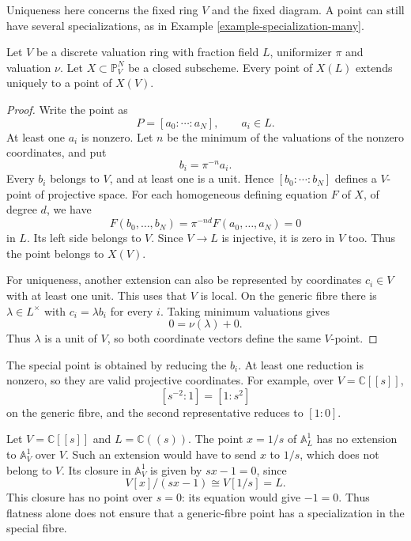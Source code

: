 Uniqueness here concerns the fixed ring
$V$ and the fixed diagram.
A point can still have several
specializations, as in Example
\ref{example-specialization-many}.

\begin{lemma}
\label{lemma-projective-dvr-extension}
Let $V$ be a discrete valuation ring
with fraction field $L$, uniformizer
$\pi$ and valuation $\nu$.
Let $X\subset\mathbb{P}^N_V$ be a closed
subscheme.
Every point of $X(L)$ extends uniquely
to a point of $X(V)$.
\end{lemma}

\begin{proof}
Write the point as
$$
P=[a_0:\cdots:a_N],\qquad a_i\in L.
$$
At least one $a_i$ is nonzero.
Let $n$ be the minimum of the valuations
of the nonzero coordinates, and put
$$
b_i=\pi^{-n}a_i.
$$
Every $b_i$ belongs to $V$, and at least
one is a unit. Hence
$[b_0:\cdots:b_N]$ defines a $V$-point
of projective space.
For each homogeneous defining equation
$F$ of $X$, of degree $d$, we have
$$
F(b_0,\ldots,b_N)
=\pi^{-nd}F(a_0,\ldots,a_N)=0
$$
in $L$.
Its left side belongs to $V$.
Since $V\to L$ is injective, it is zero
in $V$ too.
Thus the point belongs to $X(V)$.

For uniqueness, another extension can
also be represented by coordinates
$c_i\in V$ with at least one unit.
This uses that $V$ is local.
On the generic fibre there is
$\lambda\in L^\times$ with
$c_i=\lambda b_i$ for every $i$.
Taking minimum valuations gives
$$
0=\nu(\lambda)+0.
$$
Thus $\lambda$ is a unit of $V$,
so both coordinate vectors define the
same $V$-point.
\end{proof}

The special point is obtained by
reducing the $b_i$.
At least one reduction is nonzero,
so they are valid projective
coordinates.
For example, over $V=\mathbb{C}[[s]]$,
$$
[s^{-2}:1]=[1:s^2]
$$
on the generic fibre, and the second
representative reduces to $[1:0]$.

\begin{example}
\label{example-dvr-no-extension}
Let $V=\mathbb{C}[[s]]$ and
$L=\mathbb{C}((s))$.
The point $x=1/s$ of
$\mathbb{A}^1_L$ has no extension to
$\mathbb{A}^1_V$ over $V$.
Such an extension would have to send
$x$ to $1/s$, which does not belong to
$V$.
Its closure in $\mathbb{A}^1_V$ is
given by $sx-1=0$, since
$$
V[x]/(sx-1)\cong V[1/s]=L.
$$
This closure has no point over $s=0$:
its equation would give $-1=0$.
Thus flatness alone does not ensure
that a generic-fibre point has a
specialization in the special fibre.
\end{example}

